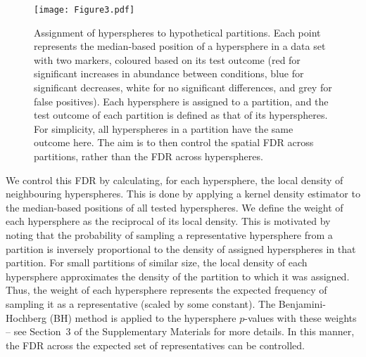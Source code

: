 \documentclass{article}
\newcommand{\suppfdr}{3}
\begin{document}
\begin{figure}[bt]
    \begin{center}
        \texttt{[image: Figure3.pdf]}
    \end{center}
    \caption{
        Assignment of hyperspheres to hypothetical partitions.
        Each point represents the median-based position of a hypersphere in a data set with two markers, coloured based on its test outcome
        (red for significant increases in abundance between conditions, blue for significant decreases, white for no significant differences, and grey for false positives).
        Each hypersphere is assigned to a partition, and the test outcome of each partition is defined as that of its hyperspheres.
        For simplicity, all hyperspheres in a partition have the same outcome here.
        The aim is to then control the spatial FDR across partitions, rather than the FDR across hyperspheres.
    }
    \label{fig:fdrdemo}
\end{figure}

We control this FDR by calculating, for each hypersphere, the local density of neighbouring hyperspheres.
This is done by applying a kernel density estimator to the median-based positions of all tested hyperspheres.
We define the weight of each hypersphere as the reciprocal of its local density.
This is motivated by noting that the probability of sampling a representative hypersphere from a partition is inversely proportional to the density of assigned hyperspheres in that partition.
For small partitions of similar size, the local density of each hypersphere approximates the density of the partition to which it was assigned.
Thus, the weight of each hypersphere represents the expected frequency of sampling it as a representative (scaled by some constant).
The Benjamini-Hochberg (BH) method is applied to the hypersphere $p$-values with these weights -- see Section~\suppfdr{} of the Supplementary Materials for more details.
In this manner, the FDR across the expected set of representatives can be controlled.
\end{document}
